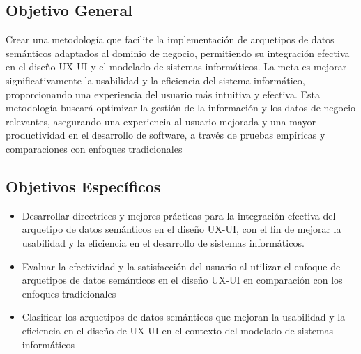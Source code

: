 \documentclass[12pt,a4paper]{article}
\begin{document}
\subsection{Objetivo General}
\label{sec:9}
Crear una metodología que facilite la implementación de arquetipos de datos semánticos adaptados al dominio de negocio, permitiendo su integración efectiva en el diseño UX-UI y el modelado de sistemas informáticos. La meta es mejorar significativamente la usabilidad y la eficiencia del sistema informático, proporcionando una experiencia del usuario más intuitiva y efectiva. Esta metodología buscará optimizar la gestión de la información y los datos de negocio relevantes, asegurando una experiencia al usuario mejorada y una mayor productividad en el desarrollo de software, a través de pruebas empíricas y comparaciones con enfoques tradicionales 
\\
\subsection{Objetivos Específicos}
\label{sec:10}
\begin{itemize}
  \item 
  Desarrollar directrices y mejores prácticas para la integración efectiva del arquetipo de datos semánticos en el diseño UX-UI, con el fin de mejorar la usabilidad y la eficiencia en el desarrollo de sistemas informáticos.
  \item 
  Evaluar la efectividad y la satisfacción del usuario al utilizar el enfoque de arquetipos de datos semánticos en el diseño UX-UI en comparación con los enfoques tradicionales
  \item 
  Clasificar los arquetipos de datos semánticos que mejoran la usabilidad y la eficiencia en el diseño de UX-UI en el contexto del modelado de sistemas informáticos
\end{itemize}

\end{document}
